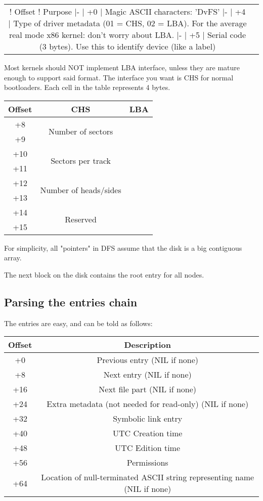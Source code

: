 \documentclass[12pt]{article}
\begin{document}
\begin{center}
\begin{tabular}{ |c|c| }
\hline
! Offset
! Purpose
|-
| +0
| Magic ASCII characters: 'DvFS'
|-
| +4
| Type of driver metadata (01 = CHS, 02 = LBA). For the average real mode x86 kernel: don't worry about LBA.
|-
| +5
| Serial code (3 bytes). Use this to identify device (like a label)
\hline
\end{tabular}
\end{center}

Most kernels should NOT implement LBA interface, unless they are mature enough to support said format. The interface you want is CHS for normal bootloaders. Each cell in the table represents 4 bytes.

\begin{center}
\begin{tabular}{ |c|c|c| }
\hline
Offset & CHS & LBA \\
\hline
+8 & \multirow{2}{2.6em}{Number of sectors} \multirow{8}{10.4em}{Number of logical blocks} \\
+9 & & \\
+10 & \multirow{2}{2.6em}{Sectors per track} & \\
+11 & & \\
+12 & \multirow{2}{2.6em}{Number of heads/sides} & \\
+13 & & \\
+14 & \multirow{2}{2.6em}{Reserved} & \\
+15 & & \\
\hline
\end{tabular}
\end{center}

For simplicity, all "pointers" in DFS assume that the disk is a big contiguous array.

The next block on the disk contains the root entry for all nodes.

\subsection{Parsing the entries chain}

The entries are easy, and can be told as follows:

\begin{center}
\begin{tabular}{ |c|c| }
\hline
Offset & Description \\
\hline
+0 & Previous entry (NIL if none) \\
+8 & Next entry (NIL if none) \\
+16 & Next file part (NIL if none) \\
+24 & Extra metadata (not needed for read-only) (NIL if none) \\
+32 & Symbolic link entry \\
+40 & UTC Creation time \\
+48 & UTC Edition time \\
+56 & Permissions \\
+64 & Location of null-terminated ASCII string representing name (NIL if none) \\
\hline
\end{tabular}
\end{center}
\end{document}
